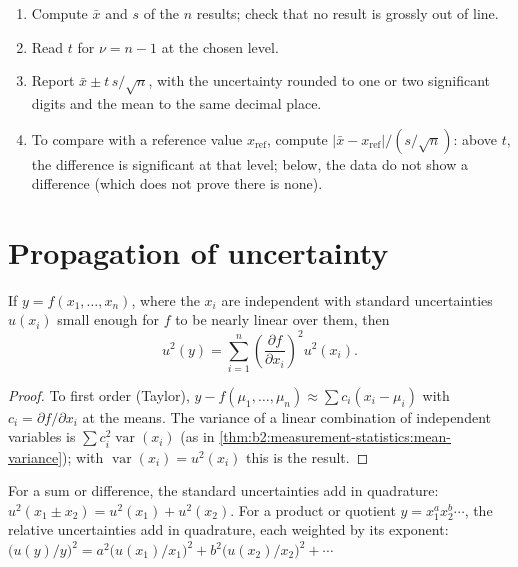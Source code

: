 \begin{method}\label{met:b2:measurement-statistics:confidence-interval}
\begin{enumerate}
  \item Compute $\bar x$ and $s$ of the $n$ results; check that no result is grossly out of line.
  \item Read $t$ for $\nu = n - 1$ at the chosen level.
  \item Report $\bar x \pm t\,s/\sqrt n$, with the uncertainty rounded to one or two significant digits
        and the mean to the same decimal place.
  \item To compare with a reference value $x_{\mathrm{ref}}$, compute $|\bar x - x_{\mathrm{ref}}|/(s/\sqrt
        n)$: above $t$, the difference is significant at that level; below, the data do not show a
        difference (which does not prove there is none).
\end{enumerate}
\end{method}

\section{Propagation of uncertainty}

\begin{theorem}\label{thm:b2:measurement-statistics:propagation}
If $y = f(x_1, \dots, x_n)$, where the $x_i$ are independent with standard uncertainties $u(x_i)$ small
enough for $f$ to be nearly linear over them, then
\begin{equation*}
u^2(y) = \sum_{i=1}^{n}\left(\frac{\partial f}{\partial x_i}\right)^2 u^2(x_i).
\end{equation*}
\end{theorem}

\begin{proof}
To first order (Taylor), $y - f(\mu_1, \dots, \mu_n) \approx \sum c_i(x_i - \mu_i)$ with $c_i = \partial
f/\partial x_i$ at the means. The variance of a linear combination of independent variables is
$\sum c_i^2\operatorname{var}(x_i)$ (as in \cref{thm:b2:measurement-statistics:mean-variance}); with
$\operatorname{var}(x_i) = u^2(x_i)$ this is the result.
\end{proof}

\begin{corollary}\label{cor:b2:measurement-statistics:products}
For a sum or difference, the standard uncertainties add in quadrature: $u^2(x_1 \pm x_2) = u^2(x_1) +
u^2(x_2)$. For a product or quotient $y = x_1^{a}x_2^{b}\cdots$, the relative uncertainties add in
quadrature, each weighted by its exponent: $\bigl(u(y)/y\bigr)^2 = a^2\bigl(u(x_1)/x_1\bigr)^2 +
b^2\bigl(u(x_2)/x_2\bigr)^2 + \cdots$
\end{corollary}

